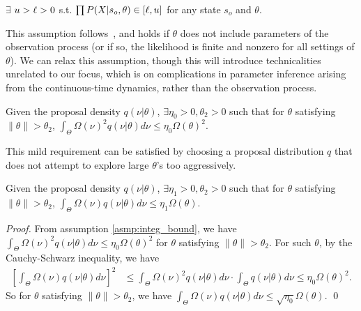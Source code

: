 \begin{assumption}
$\exists$ $ u > \ell > 0$ s.t.
$\prod P(X | s_o, \theta) \in [\ell, u]$ for any state $s_o$ and $\theta$.%
  \label{asmp:obs_bnd}
\end{assumption}
\noindent This assumption follows~\cite{miasojedow2017}, and holds if
$\theta$ does not include parameters of the observation process (or if so,
the likelihood is finite and nonzero for all settings of $\theta$). We can relax this assumption,
though this will introduce technicalities unrelated to our focus, which 
is on complications in parameter inference arising from the continuous-time
dynamics, rather than the observation process. 

\begin{assumption}
Given the proposal density $q(\nu | \theta)$, $\exists \eta_0 > 0, \theta_2 > 0$ 
such that for $\theta$ satisfying $\| \theta \|  > \theta_2$, 
$ \int_\Theta \Omega(\nu)^2 q(\nu | \theta)d\nu \leq \eta_0 \Omega(\theta)^2.$
\label{asmp:integ_bound}
\end{assumption}
\noindent This mild requirement can be satisfied by choosing a proposal 
distribution $q$ that does not attempt to explore large $\theta$'s too 
aggressively.
\begin{corollary}
Given the proposal density $q(\nu | \theta)$, $\exists \eta_1 > 0, \theta_2 > 0$ such that for $\theta$ 
satisfying $\| \theta \|  > \theta_2$, 
$ \int_\Theta \Omega(\nu) q(\nu | \theta)d\nu \leq \eta_1 \Omega(\theta).$
\label{corol:integ_bound}
\end{corollary}
\begin{proof}
From assumption \ref{asmp:integ_bound},  we have $ \int_\Theta \Omega(\nu)^2 q(\nu | \theta)d\nu \leq \eta_0 \Omega(\theta)^2$ for $\theta$ satisfying $\| \theta \|  > \theta_2$.
For such $\theta$, by the Cauchy-Schwarz inequality, we have
\begin{align*}
\left[ \int_\Theta \Omega(\nu) q(\nu | \theta) d\nu \right]^2 &\le \int_\Theta \Omega(\nu)^2 q(\nu | \theta) d\nu \cdot \int_\Theta q(\nu | \theta) d\nu \le \eta_0 \Omega(\theta)^2.
\end{align*}
So for $\theta$ satisfying $\| \theta \|  > \theta_2$, we have $\int_\Theta \Omega(\nu) q(\nu | \theta) d\nu \le \sqrt{\eta_0} \Omega(\theta).$
\qed
\end{proof}

